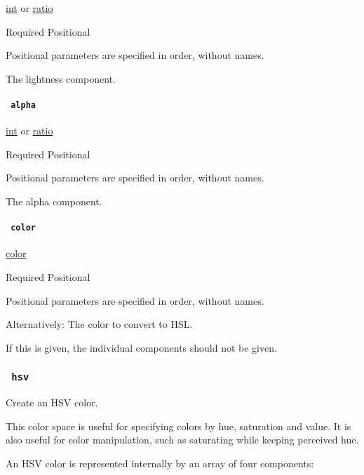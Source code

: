 \href{/docs/reference/foundations/int/}{int} {or}
\href{/docs/reference/layout/ratio/}{ratio}

{Required} {{ Positional }}

\label{definitions-hsl-lightness-positional-tooltip}
Positional parameters are specified in order, without names.

The lightness component.

\paragraph{\texorpdfstring{\texttt{\ alpha\ }}{ alpha }}\label{definitions-hsl-alpha}

\href{/docs/reference/foundations/int/}{int} {or}
\href{/docs/reference/layout/ratio/}{ratio}

{Required} {{ Positional }}

\label{definitions-hsl-alpha-positional-tooltip}
Positional parameters are specified in order, without names.

The alpha component.

\paragraph{\texorpdfstring{\texttt{\ color\ }}{ color }}\label{definitions-hsl-color}

\href{/docs/reference/visualize/color/}{color}

{Required} {{ Positional }}

\label{definitions-hsl-color-positional-tooltip}
Positional parameters are specified in order, without names.

Alternatively: The color to convert to HSL.

If this is given, the individual components should not be given.

\subsubsection{\texorpdfstring{\texttt{\ hsv\ }}{ hsv }}\label{definitions-hsv}

Create an HSV color.

This color space is useful for specifying colors by hue, saturation and
value. It is also useful for color manipulation, such as saturating
while keeping perceived hue.

An HSV color is represented internally by an array of four components:

